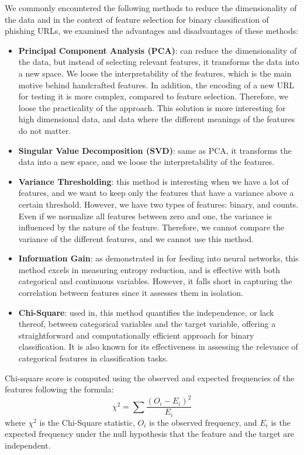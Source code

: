\documentclass{article}
\begin{document}
    We commonly encountered the following methods to reduce the dimensionality of the data and in the context of feature selection for binary classification of phishing URLs, we examined the advantages and disadvantages of these methods:
    \begin{itemize}
        \item \textbf{Principal Component Analysis (PCA)}: can reduce the dimensionality of the data, but instead of selecting relevant features, it transforms the data into a new space. We loose the interpretability of the features, which is the main motive behind handcrafted features. In addition, the encoding of a new URL for testing it is more complex, compared to feature selection. Therefore, we loose the practicality of the approach. This solution is more interesting for high dimensional data, and data where the different meanings of the features do not matter.
        \item \textbf{Singular Value Decomposition (SVD)}: same as PCA, it transforms the data into a new space, and we loose the interpretability of the features.
        \item \textbf{Variance Thresholding}: this method is interesting when we have a lot of features, and we want to keep only the features that have a variance above a certain threshold. However, we have two types of features: binary, and counts. Even if we normalize all features between zero and one, the variance is influenced by the nature of the feature. Therefore, we cannot compare the variance of the different features, and we cannot use this method.
        \item \textbf{Information Gain}: as demonstrated in\cite{EfficientDeepLearningPhishingDetection} for feeding into neural networks, this method excels in measuring entropy reduction, and is effective with both categorical and continuous variables. However, it falls short in capturing the correlation between features since it assesses them in isolation.
        \item \textbf{Chi-Square}: used in\cite{LexicalFeatureSelection}, this method quantifies the independence, or lack thereof, between categorical variables and the target variable, offering a straightforward and computationally efficient approach for binary classification. It is also known for its effectiveness in assessing the relevance of categorical features in classification tasks.
    \end{itemize}

    Chi-square score is computed using the observed and expected frequencies of the features following the formula:
    \begin{equation}
        \chi^2 = \sum \frac{(O_i - E_i)^2}{E_i}\label{eq:equation}
    \end{equation}
    where \( \chi^2 \) is the Chi-Square statistic, \( O_i \) is the observed frequency, and \( E_i \) is the expected frequency under the null hypothesis that the feature and the target are independent.
\end{document}
